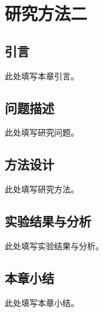 \chapter{研究方法二}
\label{chap:method-two}
\section{引言}
此处填写本章引言。
\section{问题描述}
此处填写研究问题。
\section{方法设计}
此处填写研究方法。
\section{实验结果与分析}
此处填写实验结果与分析。
\section{本章小结}
此处填写本章小结。
